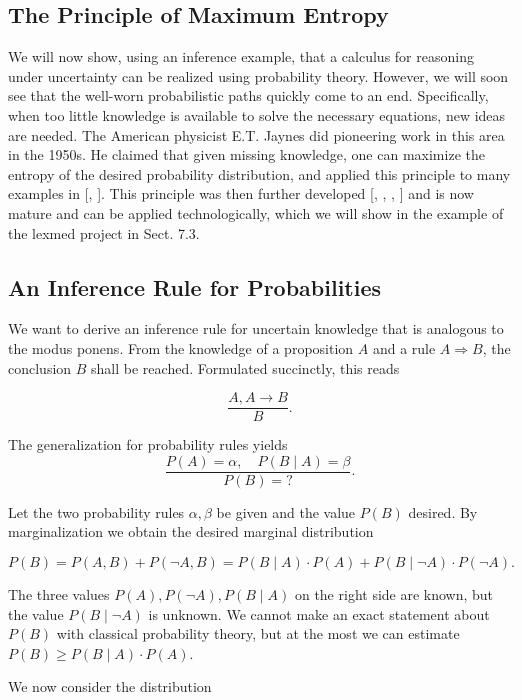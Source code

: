 \documentclass[10pt]{book}
\begin{document}
\subsection{The Principle of Maximum Entropy}
We will now show, using an inference example, that a calculus for reasoning under uncertainty can be realized using probability theory. However, we will soon see that the well-worn probabilistic paths quickly come to an end. Specifically, when too little knowledge is available to solve the necessary equations, new ideas are needed. The American physicist E.T. Jaynes did pioneering work in this area in the 1950s. He claimed that given missing knowledge, one can maximize the entropy of the desired probability distribution, and applied this principle to many examples in [\cite{jaynes1957itsm}, \cite{jaynes2003probability}]. This principle was then further developed [\cite{cheeseman1983generalised}, \cite{nilsson1986probabilistic}, \cite{kane1989maxent}, \cite{kapur1992entropy}] and is now mature and can be applied technologically, which we will show in the example of the lexmed project in Sect. 7.3.

\subsection{An Inference Rule for Probabilities}
We want to derive an inference rule for uncertain knowledge that is analogous to the modus ponens. From the knowledge of a proposition $A$ and a rule $A \Rightarrow B$, the conclusion $B$ shall be reached. Formulated succinctly, this reads

$$
\frac{A, A \rightarrow B}{B} .
$$

The generalization for probability rules yields
\[
\frac{P(A)=\alpha, \quad P(B \mid A)=\beta}{P(B)=?} .
\]

Let the two probability rules $\alpha, \beta$ be given and the value $P(B)$ desired. By marginalization we obtain the desired marginal distribution

\[
P(B)=P(A, B)+P(\neg A, B)=P(B \mid A) \cdot P(A)+P(B \mid \neg A) \cdot P(\neg A) .
\]

The three values $P(A), P(\neg A), P(B \mid A)$ on the right side are known, but the value $P(B \mid \neg A)$ is unknown. We cannot make an exact statement about $P(B)$ with classical probability theory, but at the most we can estimate $P(B) \geq P(B \mid A) \cdot P(A)$.

We now consider the distribution
\end{document}
